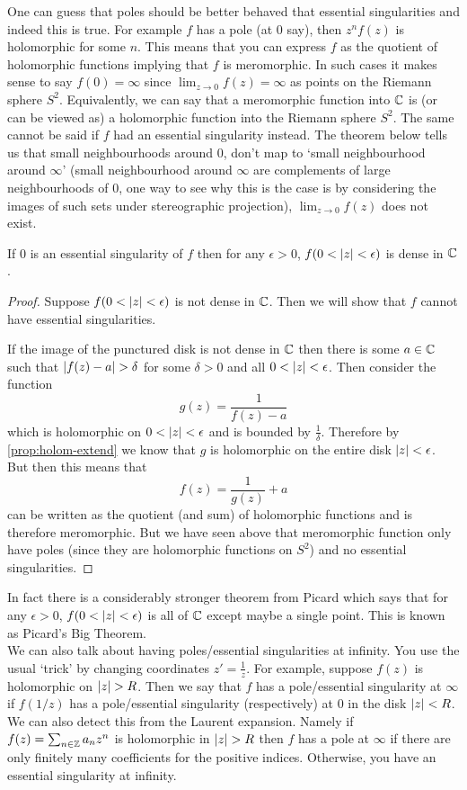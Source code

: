 One can guess that poles should be better behaved that essential singularities and indeed this is true. For example $f$ has a pole (at 0 say), then $z^n f(z)$ is holomorphic for some $n$. This means that you can express $f$ as the quotient of holomorphic functions implying that $f$ is meromorphic. In such cases it makes sense to say $f(0) = \infty$ since $\lim_{z \to 0} f(z) = \infty$ as points on the Riemann sphere $S^2$. Equivalently, we can say that a meromorphic function into $\mathbb{C}$ is (or can be viewed as) a holomorphic function into the Riemann sphere $S^2$. The same cannot be said if $f$ had an essential singularity instead. The theorem below tells us that small neighbourhoods around 0, don't map to `small neighbourhood around $\infty$' (small neighbourhood around $\infty$ are complements of large neighbourhoods of 0, one way to see why this is the case is by considering the images of such sets under stereographic projection), $\lim_{z \to 0} f(z)$ does not exist.

\begin{theorem}
If 0 is an essential singularity of $f$ then for any $\epsilon > 0$, $f(0 < \left|z\right| < \epsilon)$ is dense in $\mathbb{C}$.
\end{theorem}
\begin{proof}
Suppose $f(0 < \left|z\right| < \epsilon)$ is not dense in $\mathbb{C}$. Then we will show that $f$ cannot have essential singularities.

If the image of the punctured disk is not dense in $\mathbb{C}$ then there is some $a \in \mathbb{C}$ such that $\left|f(z) - a\right| > \delta$ for some $\delta > 0$ and all $0 < \left|z\right| < \epsilon$. Then consider the function
$$g(z) = \frac{1}{f(z) - a}$$
which is holomorphic on $0 < \left|z\right| < \epsilon$ and is bounded by $\frac{1}{\delta}$. Therefore by \autoref{prop:holom-extend} we know that $g$ is holomorphic on the entire disk $\left|z\right| < \epsilon$. But then this means that 
$$ f(z) = \frac{1}{g(z)} + a $$
can be written as the quotient (and sum) of holomorphic functions and is therefore meromorphic. But we have seen above that meromorphic function only have poles (since they are holomorphic functions on $S^2$) and no essential singularities.
\end{proof}
In fact there is a considerably stronger theorem from Picard which says that for any $\epsilon > 0$, $f(0 < \left|z\right| < \epsilon)$ is all of $\mathbb{C}$ except maybe a single point. This is known as Picard's Big Theorem.\\

We can also talk about having poles/essential singularities at infinity. You use the usual `trick' by changing coordinates $z' = \frac{1}{z}$. For example, suppose $f(z)$ is holomorphic on $\left|z\right| > R$. Then we say that $f$ has a pole/essential singularity at $\infty$ if $f(1/z)$ has a pole/essential singularity (respectively) at 0 in the disk $\left|z\right| <R$. We can also detect this from the Laurent expansion. Namely if $f(z) = \sum_{n \in \mathbb{Z}} a_n z^n$ is holomorphic in $\left|z\right| > R$ then $f$ has a pole at $\infty$ if there are only finitely many coefficients for the positive indices. Otherwise, you have an essential singularity at infinity.


